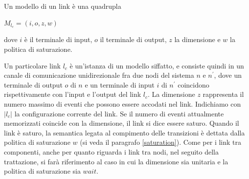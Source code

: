 \begin{defn}
Un modello di un link è una quadrupla
\begin{center}
	$M_{l_c} = (i,o,z,w)$
\end{center}
dove $i$ è il terminale di input, $o$ il terminale di output, $z$ la dimensione e $w$ la politica di saturazione.
\end{defn}
Un particolare link $l_c$ è un'istanza di un modello siffatto, e consiste quindi in un canale di comunicazione unidirezionale fra due nodi del sistema $n$ e $n^\prime$, dove un terminale di output $o$ di $n$ e un terminale di input $i$ di $n^\prime$ coincidono rispettivamente con l'input e l'output del link $l_c$.
La dimensione $z$ rappresenta il numero massimo di eventi che possono essere accodati nel link. 
Indichiamo con $|l_c|$ la configurazione corrente del link. 
Se il numero di eventi attualmente memorizzati coincide con la dimensione, il link si dice essere saturo.
Quando il link è saturo, la semantica legata al compimento delle transizioni è dettata dalla politica di saturazione $w$ (si veda il paragrafo \ref{saturation}).
Come per i link tra componenti, anche per quanto riguarda i link tra nodi, nel seguito della trattazione, si farà riferimento al caso in cui la dimensione sia unitaria e la politica di saturazione sia $wait$.

